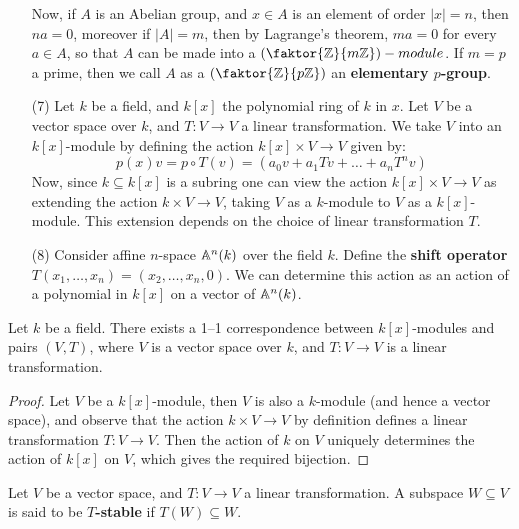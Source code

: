 \begin{definition}
\begin{example}
\begin{enumerate}
      Now, if  $A$ is an Abelian group, and  $x \in A$ is an element
      of order $|x|=n$, then  $na=0$, moreover if $|A|=m$, then by
      Lagrange's theorem, $ma=0$ for every $a \in A$, so that $A$ can
      be made into a  $(\faktor{\Z}{m\Z})-module$. If $m=p$ a prime,
      then we call $A$ as a $(\faktor{\Z}{p\Z})$ an \textbf{elementary
      $p$-group}.

    \item[(7)] Let $k$ be a field, and $k[x]$ the polynomial ring of
      $k$ in $x$. Let $V$ be a vector space over $k$, and $T:V
      \xrightarrow{} V$ a linear transformation. We take $V$ into an
      $k[x]$-module by defining the action $k[x] \times V
      \xrightarrow{} V$ given by:
      \begin{equation*}
        p(x)v=p \circ T(v)=(a_0v+a_1Tv+\dots+a_nT^nv)
      \end{equation*}
      Now, since $k \subseteq k[x]$ is a subring one can view the
      action $k[x] \times V \xrightarrow{} V$ as extending the
      action $k \times V \xrightarrow{} V$, taking $V$ as a
      $k$-module to $V$ as a  $k[x]$-module. This extension depends on
      the choice of linear transformation $T$.

    \item[(8)] Consider affine $n$-space $\mathbb{A}^n(k)$ over the field $k$.
      Define the \textbf{shift operator} $T(x_1, \dots, x_n)=(x_2,
      \dots, x_n, 0)$. We can determine this action as an action of a
      polynomial in $k[x]$ on a vector of $\mathbb{A}^n(k)$.
  \end{enumerate}
\end{example}

\begin{proposition}\label{proposition_4.1.1}
  Let $k$ be a field. There exists a 1--1 correspondence between
  $k[x]$-modules and pairs $(V,T)$, where $V$ is a vector space over
  $k$, and $T:V \xrightarrow{} V$ is a linear transformation.
\end{proposition}
\begin{proof}
  Let $V$ be a $k[x]$-module, then $V$ is also a $k$-module (and hence
  a vector space), and observe that the action $k \times V
  \xrightarrow{} V$ by definition defines a linear transformation $T:V
  \xrightarrow{} V$. Then the action of $k$ on $V$ uniquely determines
  the action of $k[x]$ on $V$, which gives the required bijection.
\end{proof}

\begin{definition}
  Let $V$ be a vector space, and  $T:V \xrightarrow{} V$ a linear
  transformation. A subspace $W \subseteq V$ is said to be
  \textbf{$T$-stable} if $T(W) \subseteq W$.
\end{definition}


\end{definition}
